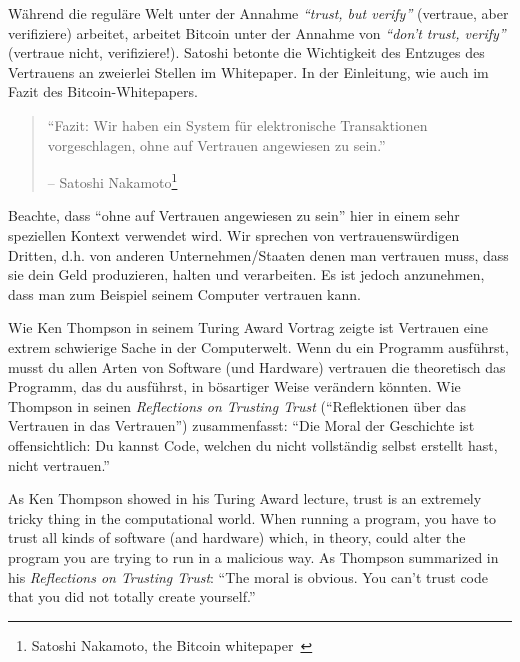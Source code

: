 Während die reguläre Welt unter der Annahme \textit{\enquote{trust, but verify}}
(vertraue, aber verifiziere) arbeitet, arbeitet Bitcoin unter der Annahme von
\textit{\enquote{don’t trust, verify}} (vertraue nicht, verifiziere!). Satoshi
betonte die Wichtigkeit des Entzuges des Vertrauens an zweierlei Stellen im
Whitepaper. In der Einleitung, wie auch im Fazit des Bitcoin-Whitepapers.

\begin{quotation}\begin{samepage}
\enquote{Fazit: Wir haben ein System für elektronische Transaktionen
vorgeschlagen, ohne auf Vertrauen angewiesen zu sein.}
\begin{flushright} -- Satoshi Nakamoto\footnote{Satoshi Nakamoto, the Bitcoin
whitepaper~\cite{whitepaper}}
\end{flushright}\end{samepage}\end{quotation}

Beachte, dass \enquote{ohne auf Vertrauen angewiesen zu sein} hier in einem sehr
speziellen Kontext verwendet wird. Wir sprechen von vertrauenswürdigen Dritten,
d.h. von anderen Unternehmen/Staaten denen man vertrauen muss, dass sie dein
Geld produzieren, halten und verarbeiten. Es ist jedoch anzunehmen, dass man zum
Beispiel seinem Computer vertrauen kann.

Wie Ken Thompson in seinem Turing Award Vortrag zeigte ist Vertrauen eine extrem
schwierige Sache in der Computerwelt. Wenn du ein Programm ausführst, musst du
allen Arten von Software (und Hardware) vertrauen die theoretisch das Programm,
das du ausführst, in bösartiger Weise verändern könnten. Wie Thompson in seinen
\textit{Reflections on Trusting Trust} (\enquote{Reflektionen über das Vertrauen
in das Vertrauen}) zusammenfasst: \enquote{Die Moral der Geschichte ist
offensichtlich: Du kannst Code, welchen du nicht vollständig selbst erstellt
hast, nicht vertrauen.}~\cite{trusting-trust}

As Ken Thompson showed in his Turing Award lecture, trust is an
extremely tricky thing in the computational world. When running a
program, you have to trust all kinds of software (and hardware) which,
in theory, could alter the program you are trying to run in a malicious
way. As Thompson summarized in his \textit{Reflections on Trusting Trust}:
\enquote{The moral is obvious. You can't trust code that you did not totally
create yourself.}~\cite{trusting-trust}

